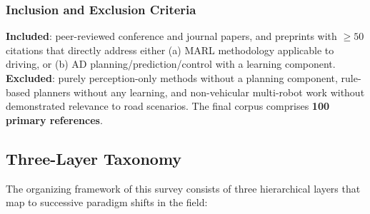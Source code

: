\documentclass[12pt, a4paper]{article}
\begin{document}
\subsubsection*{Inclusion and Exclusion Criteria}
\textbf{Included}: peer-reviewed conference and journal papers, and
preprints with $\geq 50$ citations that directly address either (a) MARL
methodology applicable to driving, or (b) AD planning/prediction/control
with a learning component.
\textbf{Excluded}: purely perception-only methods without a planning
component, rule-based planners without any learning, and non-vehicular
multi-robot work without demonstrated relevance to road scenarios.
The final corpus comprises \textbf{100 primary references}.

\subsection{Three-Layer Taxonomy}
\label{sec:taxonomy}

The organizing framework of this survey consists of three hierarchical
layers that map to successive paradigm shifts in the field:
\end{document}
